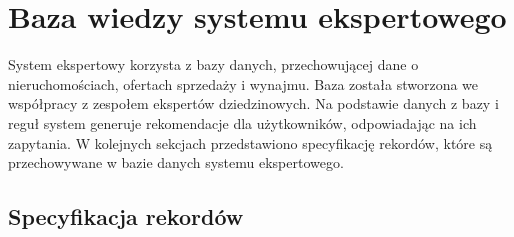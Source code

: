 \section{Baza wiedzy systemu ekspertowego}

System ekspertowy korzysta z bazy danych, przechowującej dane o nieruchomościach, ofertach sprzedaży i wynajmu. Baza została stworzona we współpracy z zespołem ekspertów dziedzinowych. Na podstawie danych z bazy i reguł system generuje rekomendacje dla użytkowników, odpowiadając na ich zapytania. W kolejnych sekcjach przedstawiono specyfikację rekordów, które są przechowywane w bazie danych systemu ekspertowego.

\subsection{Specyfikacja rekordów}

